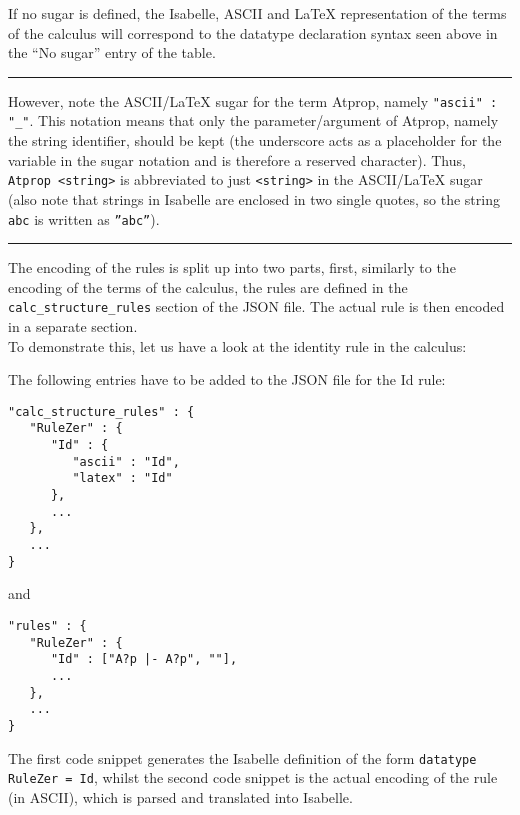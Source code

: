 \begin{enumerate}
  If no sugar is defined, the Isabelle, ASCII and LaTeX representation
  of the terms of the calculus will correspond to the datatype
  declaration syntax seen above in the ``No sugar'' entry of the table.

  \begin{center}\rule{3in}{0.4pt}\end{center}

  However, note the ASCII/LaTeX sugar for the term Atprop, namely
  \texttt{"ascii" : "\_"}. This notation means that only the
  parameter/argument of Atprop, namely the string identifier, should be
  kept (the underscore acts as a placeholder for the variable in the
  sugar notation and is therefore a reserved character). Thus,
  \texttt{Atprop \textless{}string\textgreater{}} is abbreviated to just
  \texttt{\textless{}string\textgreater{}} in the ASCII/LaTeX sugar
  (also note that strings in Isabelle are enclosed in two single quotes,
  so the string \texttt{abc} is written as \texttt{''abc''}).

  \begin{center}\rule{3in}{0.4pt}\end{center}

  The encoding of the rules is split up into two parts, first, similarly
  to the encoding of the terms of the calculus, the rules are defined in
  the \texttt{calc\_structure\_rules} section of the JSON file. The
  actual rule is then encoded in a separate section.\\ To demonstrate
  this, let us have a look at the identity rule in the calculus:

  The following entries have to be added to the JSON file for the Id
  rule:

\begin{verbatim}
"calc_structure_rules" : {
   "RuleZer" : {
      "Id" : {
         "ascii" : "Id",
         "latex" : "Id"
      },
      ...
   },
   ...
}
\end{verbatim}

  and

\begin{verbatim}
"rules" : {
   "RuleZer" : {
      "Id" : ["A?p |- A?p", ""],
      ...
   },
   ...
}
\end{verbatim}

  The first code snippet generates the Isabelle definition of the form
  \texttt{datatype RuleZer = Id}, whilst the second code snippet is the
  actual encoding of the rule (in ASCII), which is parsed and translated
  into Isabelle.


\end{enumerate}
